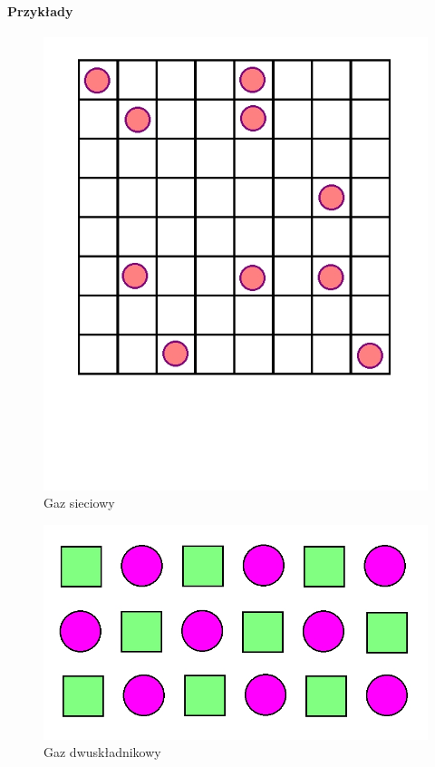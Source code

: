 \documentclass{article}
\begin{document}
		\paragraph{Przykłady}
		\begin{figure}[ht]
			\label{fig:fig1}
			\centering
			\includegraphics[scale=0.5]{gaz_sieciowy.jpeg}
			\caption{Gaz sieciowy}
		\end{figure}
		\begin{figure}[ht]
			\label{fig:fig1}
			\centering
			\includegraphics[scale=0.5]{gaz_dwuskladnikowy.jpeg}
			\caption{Gaz dwuskładnikowy}
		\end{figure}
\end{document}
